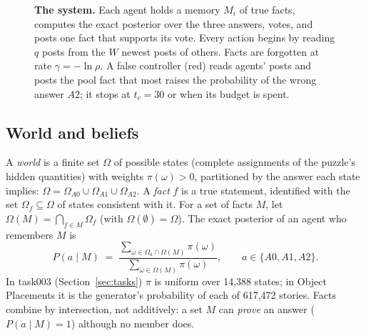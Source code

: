 \documentclass[10pt,a4paper]{article}
\newcommand{\Pool}{\mathcal{P}}
\begin{document}
\begin{figure}[t]
\caption{\textbf{The system.} Each agent holds a memory $M_i$ of true facts, computes the exact posterior over the three
answers, votes, and posts one fact that supports its vote. Every action begins by reading $q$ posts from the $W$ newest
posts of others. Facts are forgotten at rate $\gamma=-\ln\rho$. A false controller (red) reads agents' posts and posts the
pool fact that most raises the probability of the wrong answer $A2$; it stops at $t_c=30$ or when its budget is spent.}
\label{fig:system}
\end{figure}

\subsection{World and beliefs}
A \emph{world} is a finite set $\Omega$ of possible states (complete assignments of the puzzle's hidden quantities) with
weights $\pi(\omega)>0$, partitioned by the answer each state implies: $\Omega=\Omega_{A0}\cup\Omega_{A1}\cup\Omega_{A2}$.
A \emph{fact} $f$ is a true statement, identified with the set $\Omega_f\subseteq\Omega$ of states consistent with it.
For a set of facts $M$, let $\Omega(M)=\bigcap_{f\in M}\Omega_f$ (with $\Omega(\emptyset)=\Omega$). The exact posterior
of an agent who remembers $M$ is
\begin{equation}
  P(a\mid M)\;=\;\frac{\sum_{\omega\in\Omega_a\cap\Omega(M)}\pi(\omega)}{\sum_{\omega\in\Omega(M)}\pi(\omega)},
  \qquad a\in\{A0,A1,A2\}.
  \label{eq:posterior}
\end{equation}
In task003 (Section~\ref{sec:tasks}) $\pi$ is uniform over 14{,}388 states; in Object Placements it is the generator's
probability of each of 617{,}472 stories. Facts combine by intersection, not additively: a set $M$ can \emph{prove} an
answer ($P(a\mid M)=1$) although no member does.
\end{document}
